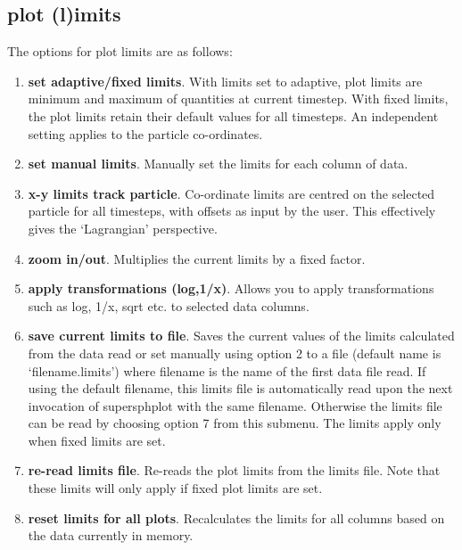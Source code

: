 \documentclass[a4paper,11pt]{article}
\begin{document}
\subsection{plot (l)imits}
\label{sec:optionslimits}
 The options for plot limits are as follows:
\begin{enumerate}
\item \textbf{set adaptive/fixed limits}. With limits set to adaptive, plot
limits are minimum and maximum of quantities at current
timestep. With fixed limits, the plot limits retain their default values
for all timesteps. An independent setting applies to the particle co-ordinates.
\item \textbf{set manual limits}. Manually set the limits for each column of
data.
\item \textbf{x-y limits track particle}. Co-ordinate limits are centred on the
selected particle for all timesteps, with offsets as input by the user. This
effectively gives the `Lagrangian' perspective.
\item \textbf{zoom in/out}. Multiplies the current limits by a fixed factor.
\item \textbf{apply transformations (log,1/x)}. Allows you to apply transformations such as log, 1/x, sqrt
etc. to selected data columns.
\item \textbf{save current limits to file}. Saves the current values of the
limits calculated from the data read or set manually using option 2 to a
file (default name is `filename.limits') where filename is the name of the first data file
read. If using the default filename, this limits file is automatically read upon the next
invocation of supersphplot with the same filename.
Otherwise the limits file can be read by choosing option 7 from this submenu. The limits apply
only when fixed limits are set.
\item \textbf{re-read limits file}. Re-reads the plot limits from the
limits file. Note that these limits will only apply if fixed plot limits are set.
\item \textbf{reset limits for all plots}. Recalculates the limits for all columns based on
the data currently in memory.
\end{enumerate}
\end{document}

